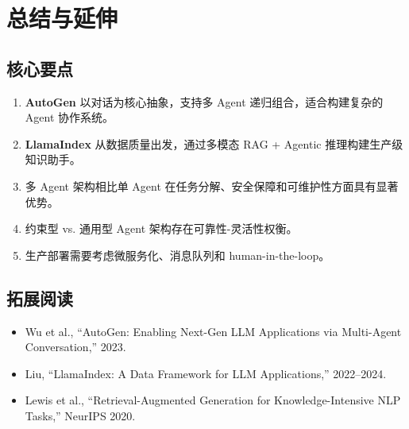 \documentclass[a4paper]{article}
\begin{document}
\section{总结与延伸}

\subsection{核心要点}

\begin{enumerate}
    \item \textbf{AutoGen} 以对话为核心抽象，支持多 Agent 递归组合，适合构建复杂的 Agent 协作系统。
    \item \textbf{LlamaIndex} 从数据质量出发，通过多模态 RAG + Agentic 推理构建生产级知识助手。
    \item 多 Agent 架构相比单 Agent 在任务分解、安全保障和可维护性方面具有显著优势。
    \item 约束型 vs. 通用型 Agent 架构存在可靠性-灵活性权衡。
    \item 生产部署需要考虑微服务化、消息队列和 human-in-the-loop。
\end{enumerate}

\subsection{拓展阅读}

\begin{itemize}
    \item Wu et al., ``AutoGen: Enabling Next-Gen LLM Applications via Multi-Agent Conversation,'' 2023.
    \item Liu, ``LlamaIndex: A Data Framework for LLM Applications,'' 2022--2024.
    \item Lewis et al., ``Retrieval-Augmented Generation for Knowledge-Intensive NLP Tasks,'' NeurIPS 2020.
\end{itemize}
\end{document}
